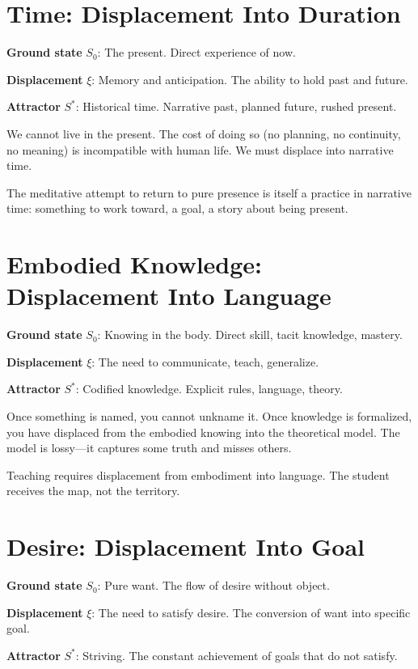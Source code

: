 \documentclass[12pt]{article}
\theoremstyle{definition}
\theoremstyle{remark}
\begin{document}
\section{Time: Displacement Into Duration}

\textbf{Ground state} $S_0$: The present. Direct experience of now.

\textbf{Displacement} $\xi$: Memory and anticipation. The ability to hold past and future.

\textbf{Attractor} $S^*$: Historical time. Narrative past, planned future, rushed present.

We cannot live in the present. The cost of doing so (no planning, no continuity, no meaning) is incompatible with human life. We must displace into narrative time.

The meditative attempt to return to pure presence is itself a practice in narrative time: something to work toward, a goal, a story about being present.

\section{Embodied Knowledge: Displacement Into Language}

\textbf{Ground state} $S_0$: Knowing in the body. Direct skill, tacit knowledge, mastery.

\textbf{Displacement} $\xi$: The need to communicate, teach, generalize.

\textbf{Attractor} $S^*$: Codified knowledge. Explicit rules, language, theory.

Once something is named, you cannot unkname it. Once knowledge is formalized, you have displaced from the embodied knowing into the theoretical model. The model is lossy—it captures some truth and misses others.

Teaching requires displacement from embodiment into language. The student receives the map, not the territory.

\section{Desire: Displacement Into Goal}

\textbf{Ground state} $S_0$: Pure want. The flow of desire without object.

\textbf{Displacement} $\xi$: The need to satisfy desire. The conversion of want into specific goal.

\textbf{Attractor} $S^*$: Striving. The constant achievement of goals that do not satisfy.
\end{document}
